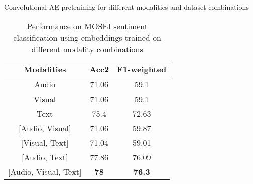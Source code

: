 \begin{table}
\centering
\caption{Convolutional AE pretraining for different modalities and dataset combinations\label{cae_pretrain}}

\centering
\caption{Performance on MOSEI sentiment classification using embeddings trained on different modality combinations\label{modalities_pretrain}}
\begin{tabular}{ccc}
{ \textbf{Modalities}}   & { \textbf{Acc2}}  & { \textbf{F1-weighted}} \\ \hline
{ Audio}                 & {71.06}          & {59.1}                \\
{ Visual}                & {71.06}          & {59.1}                \\
{ Text}                  & {75.4}          & {72.63}                \\
{ [Audio, Visual]}       & {71.06}          & {59.87}                \\
{ [Visual, Text]}        & {71.04}          & {59.01}                \\
{ [Audio, Text]}         & {77.86}          & {76.09}                \\
{ [Audio, Visual, Text]} & { \textbf{78}} & { \textbf{76.3}}      
\end{tabular}


\end{table}
